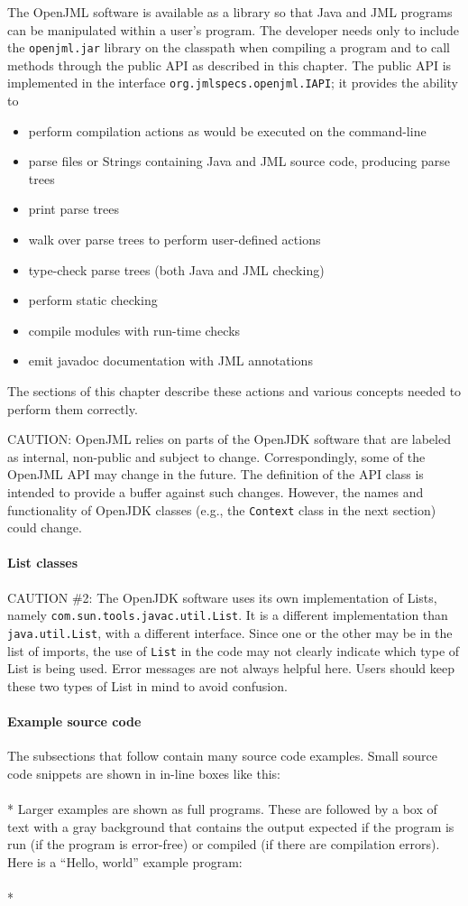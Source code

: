\documentclass{report}%
\newcommand{\boxspace}{\vspace*{6pt}}
\newlength{\savedrule}
\newlength{\thickrule}
\newlength{\framedwidth}
\newlength{\thickframedwidth}
\newcommand{\boxedexample}[1]{\boxspace \\ \fbox{\begin{minipage}{5.50in}{\tt #1}\end{minipage}}\boxspace\\*}
\newcommand{\boxedinputc}[2]{\boxspace \\ \fbox{\begin{minipage}{1.0\framedwidth}{\tt }\end{minipage}} \setlength{\fboxrule}{\thickrule} \fbox{\begin{minipage}{1.0\thickframedwidth}{\tt }\end{minipage}} \setlength{\fboxrule}{\savedrule} \boxspace\\*}
\newcommand{\source}{../../demos}
\newcommand{\demo}[1]{\boxedinputc{\source/#1.java}{\source/#1.txt}}
\begin{document}
The OpenJML software is available as a library so that Java and JML programs can be manipulated 
within a user's program. The developer needs only to include the {\tt openjml.jar} library on 
the classpath when compiling a program and to call methods through the public API as described in this chapter.
The public API is implemented in the interface {\tt org.jmlspecs.openjml.IAPI}; it provides the ability to
\begin{itemize}
\item perform compilation actions as would be executed on the command-line
\item parse files or Strings containing Java and JML source code, producing parse trees
\item print parse trees
\item walk over parse trees to perform user-defined actions
\item type-check parse trees (both Java and JML checking)
\item perform static checking
\item compile modules with run-time checks
\item emit javadoc documentation with JML annotations
\end{itemize}
The sections of this chapter describe these actions and various concepts needed to perform them correctly.

CAUTION: OpenJML relies on parts of the OpenJDK software that are labeled as internal, non-public and subject to
change. Correspondingly, some of the OpenJML API may change in the future. The definition of the API class is 
intended to provide a buffer against such changes. However, the names and functionality of OpenJDK classes (e.g.,
the {\tt Context} class in the next section) could change.

\paragraph{List classes}
CAUTION \#2: The OpenJDK software uses its own implementation of Lists, namely {\tt com.sun.tools.javac.util.List}. 
It is a different implementation than {\tt java.util.List}, with a different interface. Since one or the other may
 be in the list of imports, the use of {\tt List} in the code may not clearly indicate which type of List is being
 used. Error messages are not always helpful here. Users should keep these two types of List in mind to avoid 
 confusion.

\paragraph{Example source code}
The subsections that follow contain many source code examples. 
Small source code snippets are shown in in-line boxes like this:
\boxedexample{ // A Java comment }
Larger examples are shown as full programs. These are followed by a box of text with a gray background that contains the output expected if the program is run (if the program is error-free) or compiled (if there are compilation errors).
Here is a ``Hello, world'' example program:
\demo{DemoHelloWorld}
\end{document}
